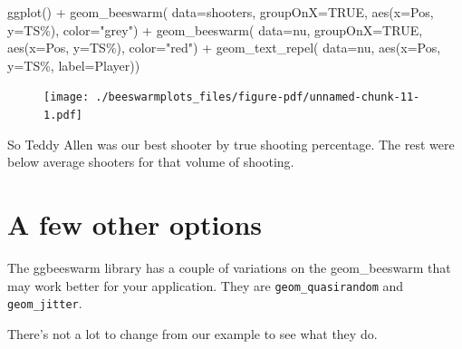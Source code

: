 \documentclass[
  letterpaper,
  DIV=11,
  numbers=noendperiod]{scrreprt}
\newenvironment{Shaded}{\begin{snugshade}}{\end{snugshade}}
\newcommand{\AttributeTok}[1]{\textcolor[rgb]{0.40,0.45,0.13}{#1}}
\newcommand{\ConstantTok}[1]{\textcolor[rgb]{0.56,0.35,0.01}{#1}}
\newcommand{\FunctionTok}[1]{\textcolor[rgb]{0.28,0.35,0.67}{#1}}
\newcommand{\NormalTok}[1]{\textcolor[rgb]{0.00,0.23,0.31}{#1}}
\newcommand{\SpecialCharTok}[1]{\textcolor[rgb]{0.37,0.37,0.37}{#1}}
\newcommand{\StringTok}[1]{\textcolor[rgb]{0.13,0.47,0.30}{#1}}
\begin{document}
\begin{Shaded}
\begin{Highlighting}[]
\FunctionTok{ggplot}\NormalTok{() }\SpecialCharTok{+} 
  \FunctionTok{geom\_beeswarm}\NormalTok{(}
    \AttributeTok{data=}\NormalTok{shooters, }
    \AttributeTok{groupOnX=}\ConstantTok{TRUE}\NormalTok{, }
    \FunctionTok{aes}\NormalTok{(}\AttributeTok{x=}\NormalTok{Pos, }\AttributeTok{y=}\StringTok{\textasciigrave{}}\AttributeTok{TS\%}\StringTok{\textasciigrave{}}\NormalTok{), }\AttributeTok{color=}\StringTok{"grey"}\NormalTok{) }\SpecialCharTok{+} 
  \FunctionTok{geom\_beeswarm}\NormalTok{(}
    \AttributeTok{data=}\NormalTok{nu, }
    \AttributeTok{groupOnX=}\ConstantTok{TRUE}\NormalTok{, }
    \FunctionTok{aes}\NormalTok{(}\AttributeTok{x=}\NormalTok{Pos, }\AttributeTok{y=}\StringTok{\textasciigrave{}}\AttributeTok{TS\%}\StringTok{\textasciigrave{}}\NormalTok{), }\AttributeTok{color=}\StringTok{"red"}\NormalTok{) }\SpecialCharTok{+} 
  \FunctionTok{geom\_text\_repel}\NormalTok{(}
    \AttributeTok{data=}\NormalTok{nu, }
    \FunctionTok{aes}\NormalTok{(}\AttributeTok{x=}\NormalTok{Pos, }\AttributeTok{y=}\StringTok{\textasciigrave{}}\AttributeTok{TS\%}\StringTok{\textasciigrave{}}\NormalTok{, }\AttributeTok{label=}\NormalTok{Player))}
\end{Highlighting}
\end{Shaded}

\begin{figure}[H]

{\centering \texttt{[image: ./beeswarmplots\_files/figure-pdf/unnamed-chunk-11-1.pdf]}

}

\end{figure}

So Teddy Allen was our best shooter by true shooting percentage. The
rest were below average shooters for that volume of shooting.

\hypertarget{a-few-other-options}{%
\section{A few other options}\label{a-few-other-options}}

The ggbeeswarm library has a couple of variations on the geom\_beeswarm
that may work better for your application. They are
\texttt{geom\_quasirandom} and \texttt{geom\_jitter}.

There's not a lot to change from our example to see what they do.
\end{document}
